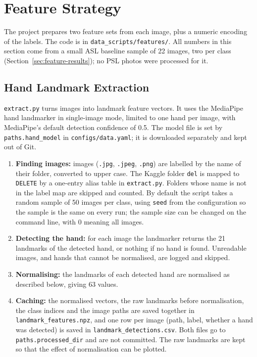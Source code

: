 \section{Feature Strategy}
\label{sec:feature-strategy}

The project prepares two feature sets from each image, plus a numeric encoding of the labels. The code is in \texttt{data\_scripts/features/}. All numbers in this section come from a small ASL baseline sample of 22 images, two per class (Section~\ref{sec:feature-results}); no PSL photos were processed for it.

\subsection{Hand Landmark Extraction}

\texttt{extract.py} turns images into landmark feature vectors. It uses the MediaPipe hand landmarker in single-image mode, limited to one hand per image, with MediaPipe's default detection confidence of 0.5. The model file is set by \texttt{paths.hand\_model} in \texttt{configs/data.yaml}; it is downloaded separately and kept out of Git.

\begin{enumerate}
  \item \textbf{Finding images:} images (\texttt{.jpg}, \texttt{.jpeg}, \texttt{.png}) are labelled by the name of their folder, converted to upper case. The Kaggle folder \texttt{del} is mapped to \texttt{DELETE} by a one-entry alias table in \texttt{extract.py}. Folders whose name is not in the label map are skipped and counted. By default the script takes a random sample of 50 images per class, using \texttt{seed} from the configuration so the sample is the same on every run; the sample size can be changed on the command line, with 0 meaning all images.
  \item \textbf{Detecting the hand:} for each image the landmarker returns the 21 landmarks of the detected hand, or nothing if no hand is found. Unreadable images, and hands that cannot be normalised, are logged and skipped.
  \item \textbf{Normalising:} the landmarks of each detected hand are normalised as described below, giving 63 values.
  \item \textbf{Caching:} the normalised vectors, the raw landmarks before normalisation, the class indices and the image paths are saved together in \texttt{landmark\_features.npz}, and one row per image (path, label, whether a hand was detected) is saved in \texttt{landmark\_detections.csv}. Both files go to \texttt{paths.processed\_dir} and are not committed. The raw landmarks are kept so that the effect of normalisation can be plotted.
\end{enumerate}

